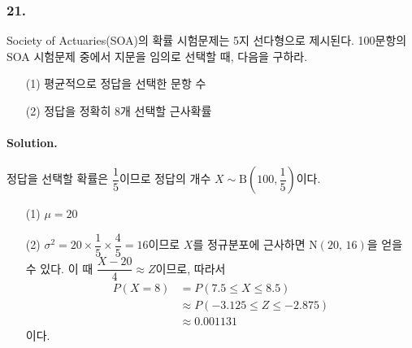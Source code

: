 \subsubsection{21.} Society of Actuaries(SOA)의 확률 시험문제는 5지 선다형으로 제시된다. 100문항의 SOA 시험문제 중에서 지문을 임의로 선택할 때, 다음을 구하라.

\begin{itemize}
	\item [(1)] 평균적으로 정답을 선택한 문항 수
	\item [(2)] 정답을 정확히 8개 선택할 근사확률
\end{itemize}

\paragraph{Solution.} 정답을 선택할 확률은 $\dfrac{1}{5}$이므로 정답의 개수 $X \sim \mathrm{B}\left(100, \dfrac{1}{5}\right)$이다.

\begin{itemize}
	\item [(1)] $\mu = 20$
	\item [(2)] {
		$\sigma^2 = 20\times\dfrac{1}{5}\times\dfrac{4}{5} = 16$이므로 $X$를 정규분포에 근사하면 $\mathrm{N}\left(20,\,16\right)$을
		얻을 수 있다. 이 때 $\dfrac{X-20}{4}\approx Z$이므로, 따라서
		\begin{align*}
			P\left(X=8\right) &= P\left(7.5\leq X\leq 8.5\right) \\
			&\approx P\left(-3.125 \leq Z \leq -2.875\right) \\
			&\approx 0.001131
		\end{align*}
		이다.
	}
\end{itemize}